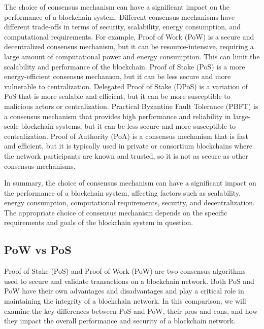 \documentclass[target=mst,aauheader=]{thud}
\begin{document}
    The choice of consensus mechanism can have a significant impact on the performance of a blockchain system. Different consensus mechanisms have different trade-offs in terms of security, scalability, energy consumption, and computational requirements. For example, Proof of Work (PoW) is a secure and decentralized consensus mechanism, but it can be resource-intensive, requiring a large amount of computational power and energy consumption. This can limit the scalability and performance of the blockchain. Proof of Stake (PoS) is a more energy-efficient consensus mechanism, but it can be less secure and more vulnerable to centralization. Delegated Proof of Stake (DPoS) is a variation of PoS that is more scalable and efficient, but it can be more susceptible to malicious actors or centralization. Practical Byzantine Fault Tolerance (PBFT) is a consensus mechanism that provides high performance and reliability in large-scale blockchain systems, but it can be less secure and more susceptible to centralization. Proof of Authority (PoA) is a consensus mechanism that is fast and efficient, but it is typically used in private or consortium blockchains where the network participants are known and trusted, so it is not as secure as other consensus mechanisms.\par
    In summary, the choice of consensus mechanism can have a significant impact on the performance of a blockchain system, affecting factors such as scalability, energy consumption, computational requirements, security, and decentralization. The appropriate choice of consensus mechanism depends on the specific requirements and goals of the blockchain system in question.

    \subsection{PoW vs PoS}

    Proof of Stake (PoS) and Proof of Work (PoW) are two consensus algorithms used to secure and validate transactions on a blockchain network. Both PoS and PoW have their own advantages and disadvantages \cite{edChainPowvsPos} and play a critical role in maintaining the integrity of a blockchain network. In this comparison, we will examine the key differences between PoS and PoW, their pros and cons, and how they impact the overall performance and security of a blockchain network.\par
\end{document}

